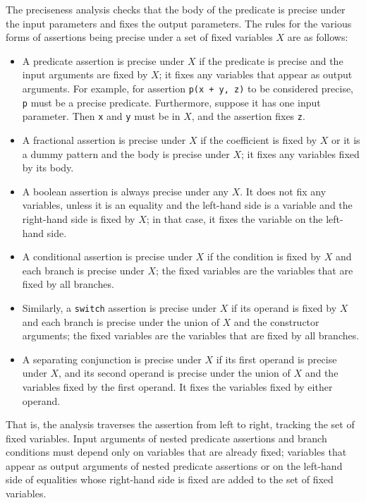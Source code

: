 \documentclass{article}
\begin{document}
The preciseness analysis checks that the body of the predicate
is precise under the input parameters and fixes the output
parameters. The rules for the various forms of assertions being
precise under a set of fixed variables $X$ are as follows:
\begin{itemize}
\item A predicate assertion is precise under $X$ if the
    predicate is precise and the input arguments are fixed
    by $X$; it fixes any variables that appear as output
    arguments. For example, for assertion %
    \lstinline|p(x + y, z)| to be considered precise,
    \lstinline|p| must be a precise predicate. Furthermore,
    suppose it has one input parameter. Then \lstinline|x|
    and \lstinline|y| must be in $X$, and the assertion
    fixes \lstinline|z|.
\item A fractional assertion is precise under $X$ if the
    coefficient is fixed by $X$ or it is a dummy pattern
    and the body is precise under $X$; it fixes any
    variables fixed by its body.
\item A boolean assertion is always precise under any $X$.
    It does not fix any variables, unless it is an equality
    and the left-hand side is a variable and the right-hand
    side is fixed by $X$; in that case, it fixes the
    variable on the left-hand side.
\item A conditional assertion is precise under $X$ if the
    condition is fixed by $X$ and each branch is precise
    under $X$; the fixed variables are the variables that
    are fixed by all branches.
\item Similarly, a \lstinline|switch| assertion is precise
    under $X$ if its operand is fixed by $X$ and each
    branch is precise under the union of $X$ and the
    constructor arguments; the fixed variables are the
    variables that are fixed by all branches.
\item A separating conjunction is precise under $X$ if its
    first operand is precise under $X$, and its second
    operand is precise under the union of $X$ and the
    variables fixed by the first operand. It fixes the
    variables fixed by either operand.
\end{itemize}
That is, the analysis traverses the assertion from left to
right, tracking the set of fixed variables. Input arguments of
nested predicate assertions and branch conditions must depend
only on variables that are already fixed; variables that appear
as output arguments of nested predicate assertions or on the
left-hand side of equalities whose right-hand side is fixed are
added to the set of fixed variables.
\end{document}
